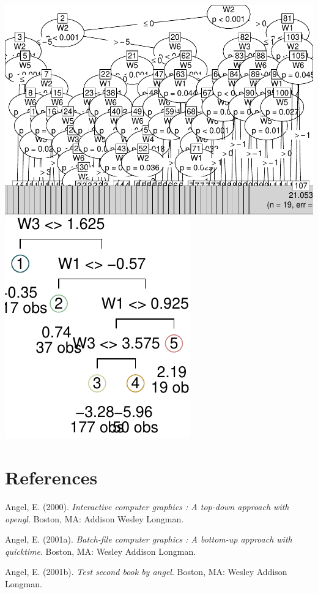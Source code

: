 \documentclass[12pt,twoside]{reedthesis}
\begin{document}
  \includegraphics{Thesis_files/figure-latex/ctree-1.pdf}
  \includegraphics{Thesis_files/figure-latex/ctree-2.pdf}
  
  \backmatter
  
  \chapter{References}\label{references}
  
  \noindent
  
  \setlength{\parindent}{-0.20in} \setlength{\leftskip}{0.20in}
  \setlength{\parskip}{8pt}
  
  \hypertarget{refs}{}
  \hypertarget{ref-angel2000}{}
  Angel, E. (2000). \emph{Interactive computer graphics : A top-down
  approach with opengl}. Boston, MA: Addison Wesley Longman.
  
  \hypertarget{ref-angel2001}{}
  Angel, E. (2001a). \emph{Batch-file computer graphics : A bottom-up
  approach with quicktime}. Boston, MA: Wesley Addison Longman.
  
  \hypertarget{ref-angel2002a}{}
  Angel, E. (2001b). \emph{Test second book by angel}. Boston, MA: Wesley
  Addison Longman.


\end{document}
